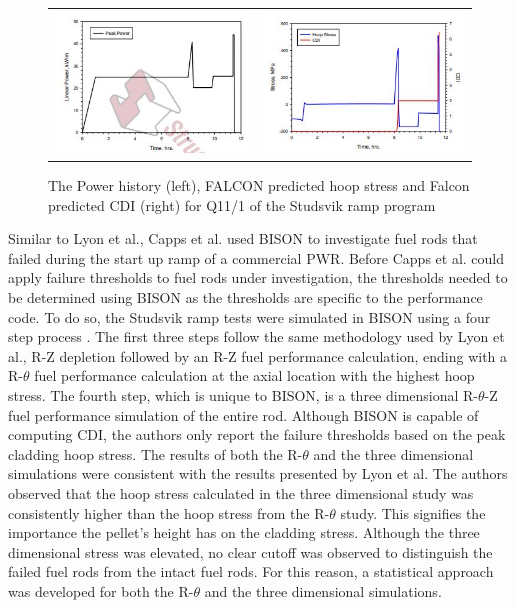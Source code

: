 \documentclass[edeposit,fullpage,11pt]{uiucthesis2009}
\begin{document}
\begin{figure}
\begin{tabular}{cc}
\includegraphics[width=0.5\linewidth]{./Figures/lyon_image_6.JPG} & \includegraphics[width=0.5\linewidth]{./Figures/lyon_image_7.JPG}
\end{tabular}
\caption{The Power history (left), FALCON predicted hoop stress and Falcon predicted CDI (right) for Q11/1 of the Studsvik ramp program \cite{lyon_pci_2009}}
\label{fig:paper_3_res}
\end{figure}


Similar to Lyon et al., Capps et al. \cite{capps_pci_2017} used BISON to investigate fuel rods that failed during the start up ramp of a commercial \gls{PWR}.
Before Capps et al. could apply failure thresholds to fuel rods under investigation, the thresholds needed to be determined using BISON as the thresholds are specific to the performance code.
To do so, the Studsvik ramp tests were simulated in BISON using a four step process \cite{killeen_experimental_2004}.
The first three steps follow the same methodology used by Lyon et al., R-Z depletion followed by an R-Z fuel performance calculation, ending with a R-$\theta$ fuel performance calculation at the axial location with the highest hoop stress.
The fourth step, which is unique to BISON, is a three dimensional R-$\theta$-Z fuel performance simulation of the entire rod. %
Although BISON is capable of computing \gls{CDI}, the authors only report the failure thresholds based on the peak cladding hoop stress.
The results of both the R-$\theta$ and the three dimensional simulations were consistent with the results presented by Lyon et al.
The authors observed that the hoop stress calculated in the three dimensional study was consistently higher than the hoop stress from the R-$\theta$ study.
This signifies the importance the pellet's height has on the cladding stress.
Although the three dimensional stress was elevated, no clear cutoff was observed to distinguish the failed fuel rods from the intact fuel rods.
For this reason, a statistical approach was developed for both the R-$\theta$ and the three dimensional simulations.
\end{document}
